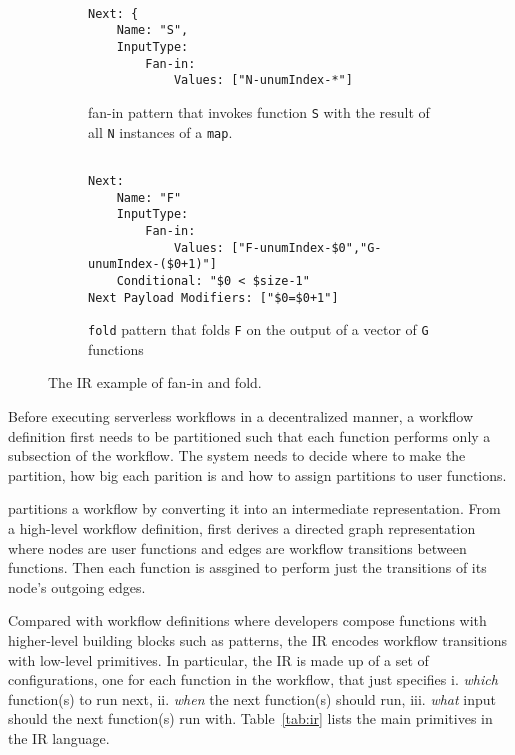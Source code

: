 \begin{figure}[t!]
	\centering
	\begin{subfigure}[t]{\columnwidth}
		\centering
		\begin{verbatim}

Next: {
    Name: "S",
    InputType: 
    	Fan-in:
            Values: ["N-unumIndex-*"]
		\end{verbatim}
		\caption{fan-in pattern that invokes function \texttt{S} with the
			result of all \texttt{N} instances of a \texttt{map}.}
		\label{fig:gadget-examples-fanin}
	\end{subfigure}

	\begin{subfigure}[t]{\columnwidth}
		\centering
		\begin{verbatim}

Next:
    Name: "F"
    InputType:
        Fan-in:
            Values: ["F-unumIndex-$0","G-unumIndex-($0+1)"]
    Conditional: "$0 < $size-1"
Next Payload Modifiers: ["$0=$0+1"]
		\end{verbatim}
		\caption{\texttt{fold} pattern that folds \texttt{F} on the output of
		a vector of \texttt{G} functions}
		\label{fig:gadget-examples-fold}
	\end{subfigure}

	\caption{The \name{} IR example of fan-in and fold.}
	\label{fig:ir-examples}
\end{figure}

Before executing serverless workflows in a decentralized manner, a workflow
definition first needs to be partitioned such that each function performs only
a subsection of the workflow. The system needs to decide where to make the
partition, how big each parition is and how to assign partitions to user
functions.

\name{} partitions a workflow by converting it into an intermediate
representation. From a high-level workflow definition, \name{} first derives a
directed graph representation where nodes are user functions and edges are
workflow transitions between functions. Then each function is assgined to
perform just the transitions of its node's outgoing edges.

Compared with workflow definitions where developers compose functions with
higher-level building blocks such as patterns, the \name{} IR encodes workflow
transitions with low-level primitives. In particular, the IR is made up of a
set of configurations, one for each function in the workflow, that just
specifies i. \textit{which} function(s) to run next, ii. \textit{when} the
next function(s) should run, iii. \textit{what} input should the next
function(s) run with. Table~\ref{tab:ir} lists the main primitives in the
\name{} IR language.


